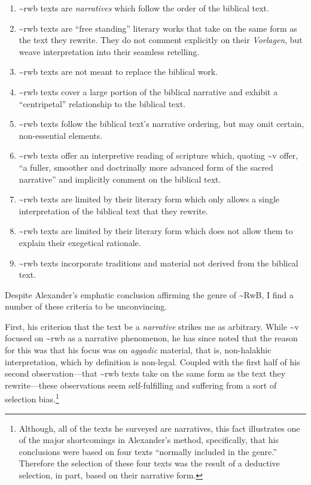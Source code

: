 \begin{enumerate}
\def\labelenumi{\arabic{enumi}.}
\tightlist
\item
  \textasciitilde{}rwb texts are \emph{narratives} which follow the
  order of the biblical text.
\item
  \textasciitilde{}rwb texts are ``free standing'' literary works that
  take on the same form as the text they rewrite. They do not comment
  explicitly on their \emph{Vorlagen}, but weave interpretation into
  their seamless retelling.
\item
  \textasciitilde{}rwb texts are not meant to replace the biblical work.
\item
  \textasciitilde{}rwb texts cover a large portion of the biblical
  narrative and exhibit a ``centripetal'' relationship to the biblical
  text.
\item
  \textasciitilde{}rwb texts follow the biblical text's narrative
  ordering, but may omit certain, non-essential elements.
\item
  \textasciitilde{}rwb texts offer an interpretive reading of scripture
  which, quoting \textasciitilde{}v offer, ``a fuller, smoother and
  doctrinally more advanced form of the sacred
  narrative''\autocite[Citing \textasciitilde{}v in][305]{schurer1986}
  and implicitly comment on the biblical text.
\item
  \textasciitilde{}rwb texts are limited by their literary form which
  only allows a single interpretation of the biblical text that they
  rewrite.
\item
  \textasciitilde{}rwb texts are limited by their literary form which
  does not allow them to explain their exegetical rationale.
\item
  \textasciitilde{}rwb texts incorporate traditions and material not
  derived from the biblical text.
\end{enumerate}

Despite Alexander's emphatic conclusion affirming the genre of
\textasciitilde{}RwB, I find a number of these criteria to be
unconvincing.

First, his criterion that the text be a \emph{narrative} strikes me as
arbitrary. While \textasciitilde{}v focused on \textasciitilde{}rwb as a
narrative phenomenon, he has since noted that the reason for this was
that his focus was on \emph{aggadic} material, that is, non-halakhic
interpretation, which by definition is non-legal. Coupled with the first
half of his second observation---that \textasciitilde{}rwb texts take on
the same form as the text they rewrite---these observations seem
self-fulfilling and suffering from a sort of selection bias.\footnote{Although,
  all of the texts he surveyed are narratives, this fact illustrates one
  of the major shortcomings in Alexander's method, specifically, that
  his conclusions were based on four texts ``normally included in the
  genre.''\autocite[99]{alexander_carson-williamson1988} Therefore the
  selection of these four texts was the result of a deductive selection,
  in part, based on their narrative form.}

